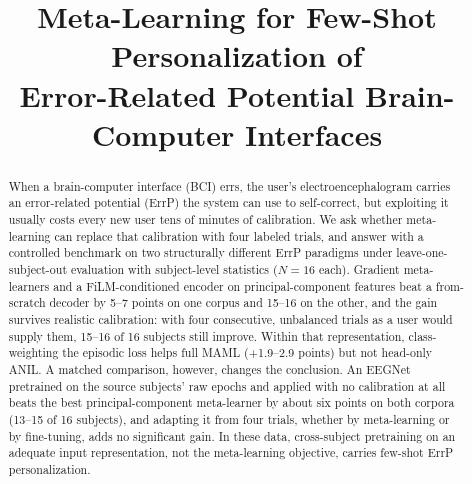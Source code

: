 \documentclass[conference,a4paper]{IEEEtran}
\begin{document}
\title{Meta-Learning for Few-Shot Personalization of\\Error-Related Potential Brain-Computer Interfaces}

\author{
\and
{}
}

\maketitle
\IEEEpubidadjcol


\begin{abstract}
When a brain-computer interface (BCI) errs, the user's electroencephalogram carries
an error-related potential (ErrP) the system can use to self-correct, but exploiting it
usually costs every new user tens of minutes of calibration. We ask whether
meta-learning can replace that calibration with four labeled trials, and answer with
a controlled benchmark on two structurally different ErrP paradigms under
leave-one-subject-out evaluation with subject-level statistics ($N{=}16$ each).
Gradient meta-learners and a FiLM-conditioned encoder on principal-component features
beat a from-scratch decoder by 5--7 points on one corpus and 15--16 on the other, and
the gain survives realistic calibration: with four consecutive, unbalanced trials as
a user would supply them, 15--16 of 16 subjects still improve. Within that representation, class-weighting the
episodic loss helps full MAML (+1.9--2.9 points) but not head-only ANIL. A matched
comparison, however, changes the conclusion. An EEGNet pretrained on the source
subjects' raw epochs and applied with no calibration at all beats the best
principal-component meta-learner by about six points on both corpora (13--15 of 16
subjects), and adapting it from four trials, whether by meta-learning or by
fine-tuning, adds no significant gain. In these data, cross-subject pretraining on an adequate input representation, not the meta-learning objective, carries few-shot ErrP personalization.
\end{abstract}
\end{document}

